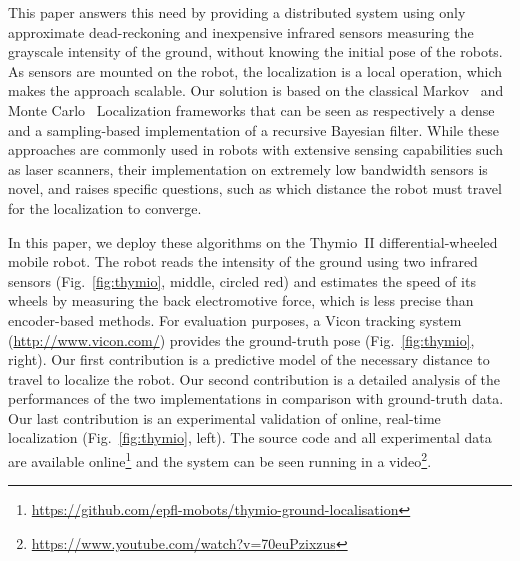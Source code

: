 \documentclass{svmult}
\newcommand{\fig}[1]{Fig.~\ref{fig:#1}}
\begin{document}
This paper answers this need by providing a distributed system using only approximate dead-reckoning and inexpensive infrared sensors measuring the grayscale intensity of the ground, without knowing the initial pose of the robots.
As sensors are mounted on the robot, the localization is a local operation, which makes the approach scalable.
Our solution is based on the classical Markov~\cite{fox1999markov} and Monte Carlo~\cite{dellaert1999monte} Localization frameworks that can be seen as respectively a dense and a sampling-based implementation of a recursive Bayesian filter.
While these approaches are commonly used in robots with extensive sensing capabilities such as laser scanners, their implementation on extremely low bandwidth sensors is novel, and raises specific questions, such as which distance the robot must travel for the localization to converge.

In this paper, we deploy these algorithms on the Thymio~II differential-wheeled mobile robot.
The robot reads the intensity of the ground using two infrared sensors (\fig{thymio}, middle, circled red) and estimates the speed of its wheels by measuring the back electromotive force, which is less precise than encoder-based methods.
For evaluation purposes, a Vicon tracking system (\url{http://www.vicon.com/}) provides the ground-truth pose (\fig{thymio}, right).
Our first contribution is a predictive model of the necessary distance to travel to localize the robot.
Our second contribution is a detailed analysis of the performances of the two implementations in comparison with ground-truth data.
Our last contribution is an experimental validation of online, real-time localization (\fig{thymio}, left).
The source code and all experimental data are available online\footnote{\url{https://github.com/epfl-mobots/thymio-ground-localisation}} and the system can be seen running in a video\footnote{\url{https://www.youtube.com/watch?v=70euPzixzus}}.
\end{document}

